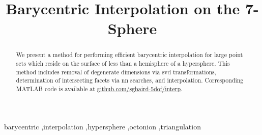 \documentclass[final,12pt]{elsarticle}
\begin{document}
	
	\sloppy %
	
	\begin{frontmatter}
		
		\title{Barycentric Interpolation on the 7-Sphere}
		
		
		
		\begin{abstract}
			We present a method for performing efficient barycentric interpolation for large point sets which reside on the surface of less than a hemisphere of a hypersphere. This method includes removal of degenerate dimensions via \gls{svd} transformations, determination of intersecting facets via \gls{nn} searches, and interpolation. Corresponding MATLAB code is available at \url{github.com/sgbaird-5dof/interp}.
		\end{abstract}
	
	\begin{keyword}
		barycentric \sep interpolation \sep hypersphere \sep octonion \sep triangulation %
	\end{keyword}

	\end{frontmatter}
\end{document}
